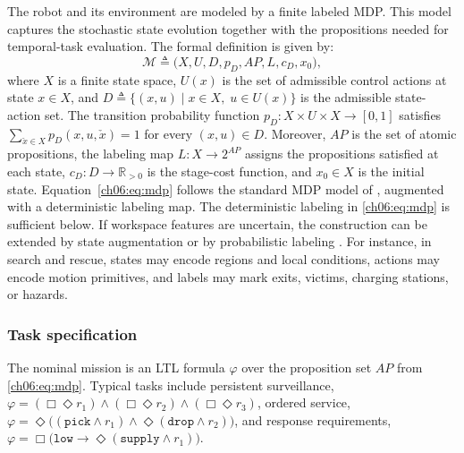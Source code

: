 The robot and its environment are modeled by a finite labeled MDP. This model
captures the stochastic state evolution together with the propositions needed
for temporal-task evaluation. The formal definition is given by:
\begin{equation}
\label{ch06:eq:mdp}
\mathcal{M} \triangleq
\bigl(X, U, D, p_D, AP, L, c_D, x_0\bigr),
\end{equation}
where $X$ is a finite state space, $U(x)$ is the set of admissible control
actions at state $x \in X$, and
$D \triangleq \{(x,u) \mid x \in X,\; u \in U(x)\}$ is the admissible
state-action set. The transition probability function
$p_D \colon X \times U \times X \rightarrow [0,1]$ satisfies
$\sum_{\check{x} \in X} p_D(x,u,\check{x}) = 1$ for every $(x,u) \in D$.
Moreover, $AP$ is the set of atomic propositions, the labeling map
$L \colon X \rightarrow 2^{AP}$ assigns the propositions satisfied at each
state, $c_D \colon D \rightarrow \mathbb{R}_{>0}$ is the stage-cost function,
and $x_0 \in X$ is the initial state. Equation~\eqref{ch06:eq:mdp} follows the
standard MDP model of \citet{puterman2014markov}, augmented with a deterministic
labeling map.
The deterministic labeling in \eqref{ch06:eq:mdp} is sufficient below. If
workspace features are uncertain, the construction can be extended by state
augmentation or by probabilistic labeling
\citep{guo2018probabilistic}. For instance, in search and rescue, states may
encode regions and local conditions, actions may encode motion primitives, and
labels may mark exits, victims, charging stations, or hazards.


\subsubsection{Task specification}
\label{ch06:subsec:LTL}


The nominal mission is an LTL formula $\varphi$ over the proposition set
$AP$ from \eqref{ch06:eq:mdp}. 
Typical tasks include persistent surveillance,
$\varphi = (\Box \Diamond r_1) \wedge (\Box \Diamond r_2)
\wedge (\Box \Diamond r_3)$, ordered service,
$\varphi = \Diamond \bigl((\texttt{pick} \wedge r_1) \wedge
\Diamond (\texttt{drop} \wedge r_2)\bigr)$, and response requirements,
$\varphi = \Box \bigl(\texttt{low} \rightarrow
\Diamond (\texttt{supply} \wedge r_1)\bigr)$.


